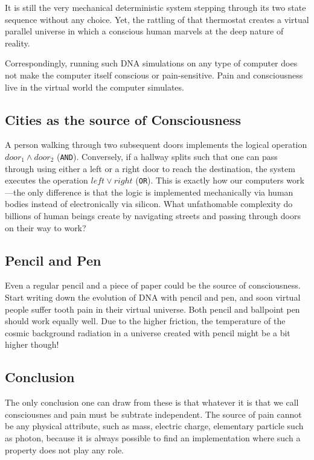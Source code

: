 It is still the very mechanical deterministic system stepping through its two state sequence without any choice. Yet, the rattling of that thermostat creates a virtual parallel
universe in which a conscious human marvels at the deep nature of reality.

Correspondingly, running such DNA simulations on any type of computer does not make the computer itself conscious or pain-sensitive. Pain and consciousness live in
the virtual world the computer simulates.


\subsection*{Cities as the source of Consciousness}

A person walking through two subsequent doors implements the logical operation $door_{1} \land door_{2}$ (\texttt{AND}).
Conversely, if a hallway splits such that one can pass through using either a left or a right door to reach the destination, the system executes the operation $left \lor right$ (\texttt{OR}).
This is exactly how our computers work---the only difference is that the logic is implemented mechanically via human bodies instead of electronically via silicon.
What unfathomable complexity do billions of human beings create by navigating streets and passing through doors on their way to work?

\subsection*{Pencil and Pen}

Even a regular pencil and a piece of paper could be the source of consciousness.
Start writing down the evolution of DNA with pencil and pen, and soon virtual people suffer tooth pain in their virtual universe.
Both pencil and ballpoint pen should work equally well.
Due to the higher friction, the temperature of the cosmic background radiation in a universe created with pencil might be a bit higher though!


\subsection*{Conclusion}

The only conclusion one can draw from these is that whatever it is that we call consciousnes and pain must be subtrate independent.
The source of pain cannot be any physical attribute, such as mass, electric charge, elementary particle such as photon, 
because it is always possible to find an implementation where such a property does not play any role.

